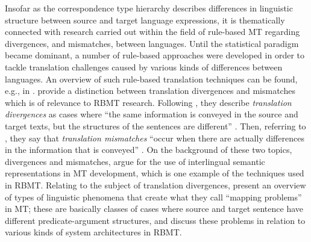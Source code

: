 \documentclass[output=paper]{LSP/langsci}
\begin{document}
Insofar as the correspondence type hierarchy describes differences in linguistic structure between source and target language expressions, it is thematically connected with research carried out within the field of rule-based MT regarding divergences, and mismatches, between languages. Until the statistical paradigm became dominant, a number of rule-based approaches were developed in order to tackle translation challenges caused by various kinds of differences between languages. An overview of such rule-based translation techniques can be found, e.g., in \citet{Trujillo1999}.
\citet{BarnettEtAl1991} provide a distinction between translation divergences and mismatches which is of relevance to RBMT research. Following \citet{Dorr1990}, they describe \textit{translation divergences} as cases where ``the same information is conveyed in the source and target texts, but the structures of the sentences are different'' \citep[25]{BarnettEtAl1991}. Then, referring to \citet{Kameyama1991}, they say that \textit{translation mismatches} ``occur when there are actually differences in the information that is conveyed'' \citep[25]{BarnettEtAl1991}. On the background of these two topics, divergences and mismatches, \citet{BarnettEtAl1991} argue for the use of interlingual semantic representations in MT development, which is one example of the techniques used in RBMT. Relating to the subject of translation divergences, 
\citet[9-10]{DorrEtAl1998} present an overview of types of linguistic phenomena that create what they call ``mapping problems'' in MT; these are basically classes of cases where source and target sentence have different predicate-argument structures, and \citet[13-18]{DorrEtAl1998} discuss these problems in relation to various kinds of system architectures in RBMT. 
\end{document}
